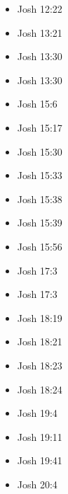 \documentclass[14pt]{article}
\begin{document}
\begin{multicols}{2}
\begin{itemize}
			\item Josh 12:22
			
			\item Josh 13:21
			
			\item Josh 13:30
			
			\item Josh 13:30
			
			\item Josh 15:6
			
			\item Josh 15:17
			
			\item Josh 15:30
			
			\item Josh 15:33
			
			\item Josh 15:38
			
			\item Josh 15:39
			
			\item Josh 15:56
			
			\item Josh 17:3
			
			\item Josh 17:3
			
			\item Josh 18:19
			
			\item Josh 18:21
			
			\item Josh 18:23
			
			\item Josh 18:24
			
			\item Josh 19:4
			
			\item Josh 19:11
			
			\item Josh 19:41
			
			\item Josh 20:4
			

\end{itemize}
\end{multicols}
\end{document}
